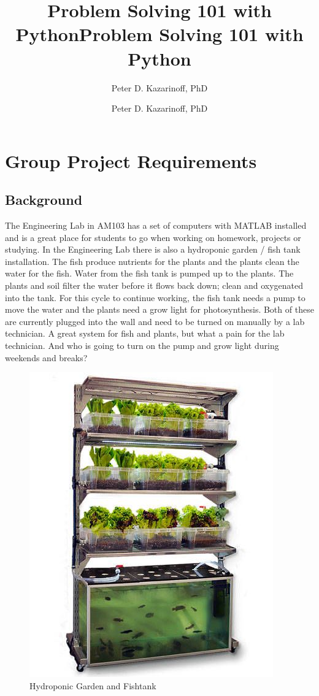 \documentclass[11pt]{article}
\title{Problem Solving 101 with Python}
\author{Peter D. Kazarinoff, PhD}
\date{}
\title{Problem Solving 101 with Python}
\author{Peter D. Kazarinoff, PhD}
\date{}
\makeatletter
\def\maxwidth{\ifdim\Gin@nat@width>\linewidth\linewidth
    \else\Gin@nat@width\fi}
\let\Oldincludegraphics\includegraphics
\renewcommand{\includegraphics}[1]{\Oldincludegraphics[width=.8\maxwidth]{#1}}
\makeatother
\begin{document}
    
    
    

    
    

    
    \hypertarget{group-project-requirements}{%
\section{Group Project Requirements}\label{group-project-requirements}}

    \hypertarget{background}{%
\subsection{Background}\label{background}}

    The Engineering Lab in AM103 has a set of computers with MATLAB
installed and is a great place for students to go when working on
homework, projects or studying. In the Engineering Lab there is also a
hydroponic garden / fish tank installation. The fish produce nutrients
for the plants and the plants clean the water for the fish. Water from
the fish tank is pumped up to the plants. The plants and soil filter the
water before it flows back down; clean and oxygenated into the tank. For
this cycle to continue working, the fish tank needs a pump to move the
water and the plants need a grow light for photosynthesis. Both of these
are currently plugged into the wall and need to be turned on manually by
a lab technician. A great system for fish and plants, but what a pain
for the lab technician. And who is going to turn on the pump and grow
light during weekends and breaks?

    \begin{figure}[h!]
\centering
\includegraphics{images/image1.jpg}
\caption{Hydroponic Garden and Fishtank}
\end{figure}
\end{document}
